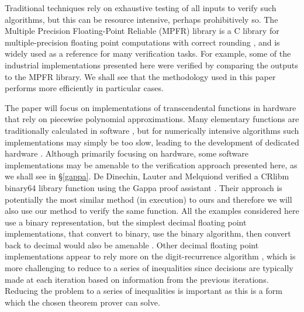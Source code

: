 \documentclass{fac}
\begin{document}
Traditional techniques rely on exhaustive testing of all inputs to verify such algorithms, but this can be resource intensive, perhaps prohibitively so. The Multiple Precision Floating-Point Reliable (MPFR) library is a C library for multiple-precision floating point computations with correct rounding \cite{fousse2007mpfr}, and is widely used as a reference for many verification tasks. For example, some of the industrial implementations presented here were verified by comparing the outputs to the MPFR library. We shall see that the methodology used in this paper performs more efficiently in particular cases. 

The paper will focus on implementations of transcendental functions in hardware that rely on piecewise polynomial approximations. Many elementary functions are traditionally calculated in software \cite{10.5555/1096483,gal1991accurate}, but for numerically intensive algorithms such implementations may simply be too slow, leading to the development of dedicated hardware \cite{tang1991table,strollo2011elementary,pineiro2004algorithm}. Although primarily focusing on hardware, some software implementations may be amenable to the verification approach presented here, as we shall see in \S\ref{gappa}. De Dinechin, Lauter and Melquiond verified a CRlibm binary64 library function using the Gappa proof assistant \cite{daramy2009cr,5483294}. Their approach is potentially the most similar method (in execution) to ours and therefore we will also use our method to verify the same function. All the examples considered here use a binary representation, but the simplest decimal floating point implementations, that convert to binary, use the binary algorithm, then convert back to decimal would also be amenable \cite{5223332}. Other decimal floating point implementations appear to rely more on the digit-recurrence algorithm \cite{5223326,5710893}, which is more challenging to reduce to a series of inequalities since decisions are typically made at each iteration based on information from the previous iterations. Reducing the problem to a series of inequalities is important as this is a form which the chosen theorem prover can solve.

\end{document}
